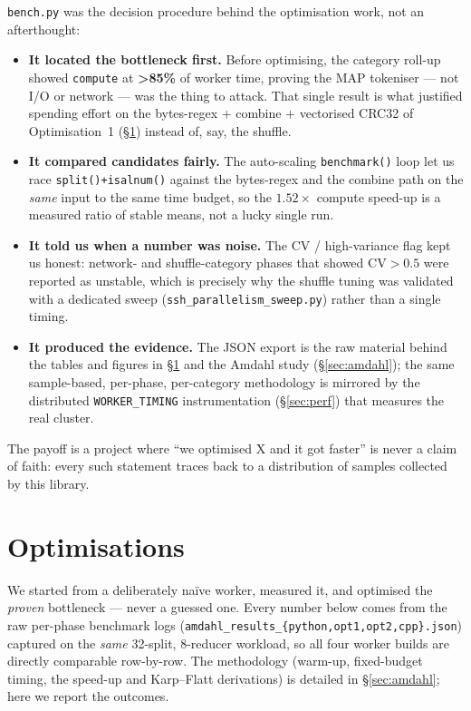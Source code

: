 \documentclass[11pt,a4paper]{article}
\newcommand{\code}[1]{\texttt{\small #1}}
\begin{document}
\code{bench.py} was the decision procedure behind the optimisation work, not an
afterthought:
\begin{itemize}
\item \textbf{It located the bottleneck first.} Before optimising, the category
roll-up showed \code{compute} at \textbf{>85\%} of worker time, proving the MAP
tokeniser --- not I/O or network --- was the thing to attack. That single result
is what justified spending effort on the bytes-regex + combine + vectorised CRC32
of Optimisation~1 (\S\ref{sec:opt}) instead of, say, the shuffle.
\item \textbf{It compared candidates fairly.} The auto-scaling
\code{benchmark()} loop let us race \code{split()+isalnum()} against the
bytes-regex and the combine path on the \emph{same} input to the same time
budget, so the $1.52\times$ compute speed-up is a measured ratio of stable means,
not a lucky single run.
\item \textbf{It told us when a number was noise.} The CV / high-variance flag
kept us honest: network- and shuffle-category phases that showed
$\mathrm{CV}>0.5$ were reported as unstable, which is precisely why the shuffle
tuning was validated with a dedicated sweep
(\code{ssh\_parallelism\_sweep.py}) rather than a single timing.
\item \textbf{It produced the evidence.} The JSON export is the raw material
behind the tables and figures in \S\ref{sec:opt} and the Amdahl study
(\S\ref{sec:amdahl}); the same sample-based, per-phase, per-category methodology
is mirrored by the distributed \code{WORKER\_TIMING} instrumentation
(\S\ref{sec:perf}) that measures the real cluster.
\end{itemize}
The payoff is a project where ``we optimised X and it got faster'' is never a
claim of faith: every such statement traces back to a distribution of samples
collected by this library.

\section{Optimisations}\label{sec:opt}

We started from a deliberately naïve worker, measured it, and optimised the
\emph{proven} bottleneck --- never a guessed one. Every number below comes from
the raw per-phase benchmark logs
(\code{amdahl\_results\_\{python,opt1,opt2,cpp\}.json}) captured on the
\emph{same} 32-split, 8-reducer workload, so all four worker builds are directly
comparable row-by-row. The methodology (warm-up, fixed-budget timing, the
speed-up and Karp--Flatt derivations) is detailed in \S\ref{sec:amdahl}; here we
report the outcomes.
\end{document}
